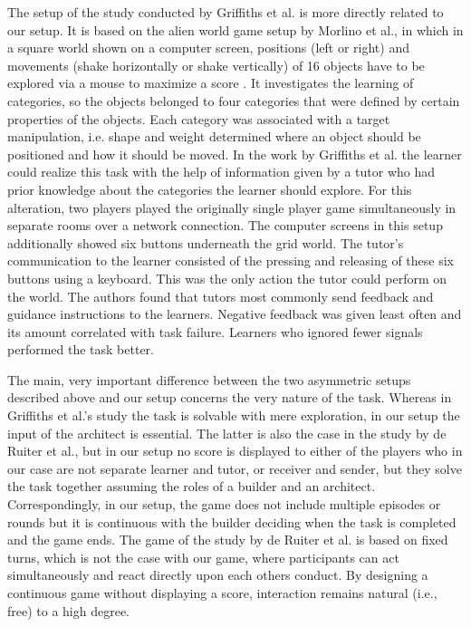 The setup of the study conducted by Griffiths et al. \cite{griffiths2012bottom} is more directly related to our setup. It is based on the alien world game setup by Morlino et al., in which in a square world shown on a computer screen, positions (left or right) and movements (shake horizontally or shake vertically) of 16 objects have to be explored via a mouse to maximize a score \cite{morlino2010developing}. It investigates the learning of categories, so the objects belonged to four categories that were defined by certain properties of the objects. Each category was associated with a target manipulation, i.e. shape and weight determined where an object should be positioned and how it should be moved. In the work by Griffiths et al. the learner could realize this task with the help of information given by a tutor who had prior knowledge about the categories the learner should explore. For this alteration, two players played the originally single player game simultaneously in separate rooms over a network connection. The computer screens in this setup additionally showed six buttons underneath the grid world. The tutor's communication to the learner consisted of the pressing and releasing of these six buttons using a keyboard. This was the only action the tutor could perform on the world. The authors found that tutors most commonly send feedback and guidance instructions to the learners. Negative feedback was given least often and its amount correlated with task failure. Learners who ignored fewer signals performed the task better.

The main, very important difference between the two asymmetric setups described above and our setup concerns the very nature of the task. Whereas in Griffiths et al.'s study the task is solvable with mere exploration, in our setup the input of the architect is essential. The latter is also the case in the study by de Ruiter et al., but in our setup no score is displayed to either of the players who in our case are not separate learner and tutor, or receiver and sender, but they solve the task together assuming the roles of a builder and an architect. Correspondingly, in our setup, the game does not include multiple episodes or rounds but it is continuous with the builder deciding when the task is completed and the game ends. The game of the study by de Ruiter et al. is based on fixed turns, which is not the case with our game, where participants can act simultaneously and react directly upon each others conduct. By designing a continuous game without displaying a score, interaction remains natural (i.e., free) to a high degree. 

